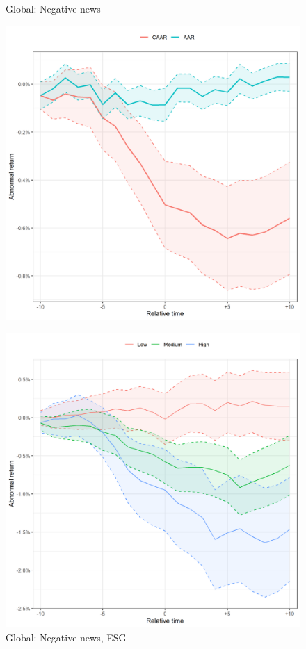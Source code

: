 \begin{figure} [H]
     \centering
     \begin{minipage}[b]{0.49\textwidth}
         \centering
    \caption{Global: Negative news}
    \includegraphics[width=\textwidth]{Projekt/1.Figures analysis/ST_negative_all_CI_nasdaq.png}
     \label{fig:ST_neg_sensitivity_nasdaq}
     \end{minipage}
     \hfill
     \begin{minipage}[b]{0.49\textwidth}
       \centering
    \caption{Global: Negative news, ESG}
    \includegraphics[width=\textwidth]{Projekt/1.Figures analysis/ST_negative_ESG_nasdaq.png}

\end{minipage}
\end{figure}
